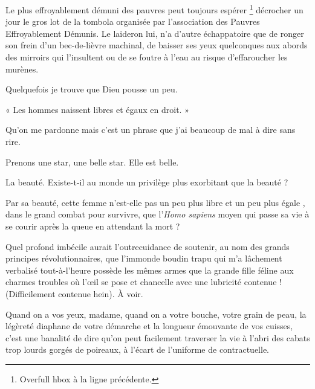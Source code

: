 \documentclass[a6paper,french,11pt,twoside]{scrartcl}
\begin{document}
Le plus effroyablement démuni des pauvres peut toujours espérer
\footnote{Overfull hbox  à la ligne précédente.}
décrocher un jour le gros lot de la tombola organisée par
l’association des Pauvres Effroyablement Démunis.
%
Le laideron lui, n’a d’autre échappatoire que de
ronger son frein d’un bec-de-lièvre machinal, de baisser ses yeux quelconques
aux abords des mirroirs qui l’insultent ou de se foutre à l’eau au risque
d’effaroucher les murènes.

Quelquefois je trouve que Dieu pousse un peu.

« Les hommes naissent libres et égaux en droit. »

Qu’on me pardonne mais c’est un phrase que j’ai beaucoup de mal à dire sans
rire. %

Prenons une star, une belle star. Elle est belle.

La beauté. Existe-t-il au monde un privilège plus exorbitant que la beauté ?

Par sa beauté, cette femme n’est-elle pas un peu plus libre
et un peu plus égale , dans le grand combat pour survivre,
que l’\textit{Homo sapiens} moyen qui passe sa vie à se courir
après la queue en attendant la mort ?

Quel profond imbécile aurait l’outrecuidance de soutenir, au nom des grands
principes révolutionnaires, que l’immonde boudin trapu qui m’a
lâchement verbalisé
tout-à-l’heure
possède les mêmes armes
que la grande fille féline aux charmes troubles où l’œil se
pose et chancelle avec une lubricité contenue !
(Difficilement contenue hein). À voir.

Quand on a vos yeux, madame, quand on a votre bouche, votre grain de peau, la
légèreté diaphane de votre démarche et la longueur émouvante de vos cuisses,
c’est une banalité de dire qu’on peut facilement traverser la vie %
à l’abri des cabats trop lourds gorgés de poireaux, à l’écart de l’uniforme de
contractuelle.
\end{document}
